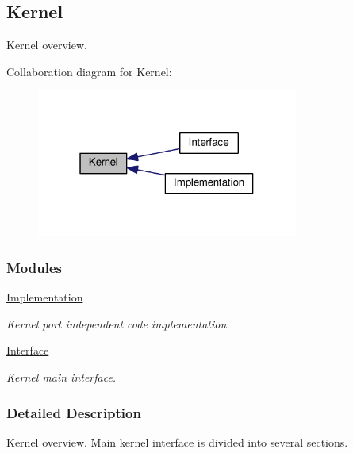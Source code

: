 \hypertarget{group__kern}{\subsection{Kernel}
\label{group__kern}
}


Kernel overview.  


Collaboration diagram for Kernel\-:\nopagebreak
\begin{figure}[H]
\begin{center}
\leavevmode
\includegraphics[width=244pt]{group__kern}
\end{center}
\end{figure}
\subsubsection*{Modules}
\begin{DoxyCompactItemize}
\item 
\hyperlink{group__kern__impl}{Implementation}
\begin{DoxyCompactList}\small\item\em Kernel port independent code implementation. \end{DoxyCompactList}\item 
\hyperlink{group__kern__intf}{Interface}
\begin{DoxyCompactList}\small\item\em Kernel main interface. \end{DoxyCompactList}\end{DoxyCompactItemize}


\subsubsection{Detailed Description}
Kernel overview. Main kernel interface is divided into several sections. 